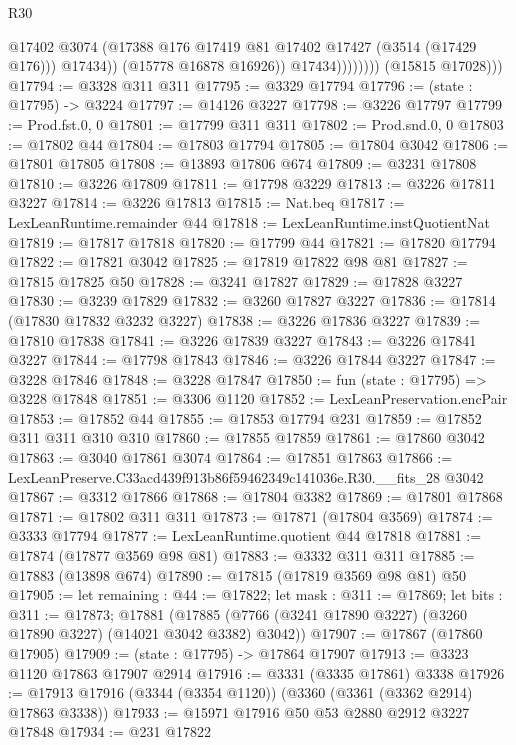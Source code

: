 \begin{lexlean}{R30}
\begin{coremodule}
                              @17402
                              @3074
                              (@17388 @176 @17419 @81 @17402 @17427 (@3514 (@17429 @176)))
                              @17434))
                          (@15778 @16878 @16926))
                        @17434))))))))
        (@15815 @17028)))
@17794 := @3328 @311 @311
@17795 := @3329 @17794
@17796 := (state : @17795) -> @3224
@17797 := @14126 @3227
@17798 := @3226 @17797
@17799 := Prod.fst.{0, 0}
@17801 := @17799 @311 @311
@17802 := Prod.snd.{0, 0}
@17803 := @17802 @44
@17804 := @17803 @17794
@17805 := @17804 @3042
@17806 := @17801 @17805
@17808 := @13893 @17806 @674
@17809 := @3231 @17808
@17810 := @3226 @17809
@17811 := @17798 @3229
@17813 := @3226 @17811 @3227
@17814 := @3226 @17813
@17815 := Nat.beq
@17817 := LexLeanRuntime.remainder @44
@17818 := LexLeanRuntime.instQuotientNat
@17819 := @17817 @17818
@17820 := @17799 @44
@17821 := @17820 @17794
@17822 := @17821 @3042
@17825 := @17819 @17822 @98 @81
@17827 := @17815 @17825 @50
@17828 := @3241 @17827
@17829 := @17828 @3227
@17830 := @3239 @17829
@17832 := @3260 @17827 @3227
@17836 := @17814 (@17830 @17832 @3232 @3227)
@17838 := @3226 @17836 @3227
@17839 := @17810 @17838
@17841 := @3226 @17839 @3227
@17843 := @3226 @17841 @3227
@17844 := @17798 @17843
@17846 := @3226 @17844 @3227
@17847 := @3228 @17846
@17848 := @3228 @17847
@17850 := fun (state : @17795) => @3228 @17848
@17851 := @3306 @1120
@17852 := LexLeanPreservation.encPair
@17853 := @17852 @44
@17855 := @17853 @17794 @231
@17859 := @17852 @311 @311 @310 @310
@17860 := @17855 @17859
@17861 := @17860 @3042
@17863 := @3040 @17861 @3074
@17864 := @17851 @17863
@17866 := LexLeanPreserve.C33acd439f913b86f59462349c141036e.R30.__fits_28 @3042
@17867 := @3312 @17866
@17868 := @17804 @3382
@17869 := @17801 @17868
@17871 := @17802 @311 @311
@17873 := @17871 (@17804 @3569)
@17874 := @3333 @17794
@17877 := LexLeanRuntime.quotient @44 @17818
@17881 := @17874 (@17877 @3569 @98 @81)
@17883 := @3332 @311 @311
@17885 := @17883 (@13898 @674)
@17890 := @17815 (@17819 @3569 @98 @81) @50
@17905 := let remaining : @44 := @17822;
  let mask : @311 := @17869;
  let bits : @311 := @17873;
  @17881 (@17885 (@7766 (@3241 @17890 @3227) (@3260 @17890 @3227) (@14021 @3042 @3382) @3042))
@17907 := @17867 (@17860 @17905)
@17909 := (state : @17795) -> @17864 @17907
@17913 := @3323 @1120 @17863 @17907 @2914
@17916 := @3331 (@3335 @17861) @3338
@17926 := @17913 @17916 (@3344 (@3354 @1120)) (@3360 (@3361 (@3362 @2914) @17863 @3338))
@17933 := @15971 @17916 @50 @53 @2880 @2912 @3227 @17848
@17934 := @231 @17822

\end{coremodule}
\end{lexlean}
